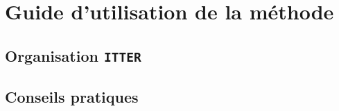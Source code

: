 \chapter{Guide d'utilisation de la méthode}
\label{chapter:5-GUIDE}

	\section{Organisation \texttt{ITTER}}
		\label{section:5.1-GUIDE-ITTER}
	
	
	\section{Conseils pratiques}
		\label{section:5.2-GUIDE-CONSEILS}
